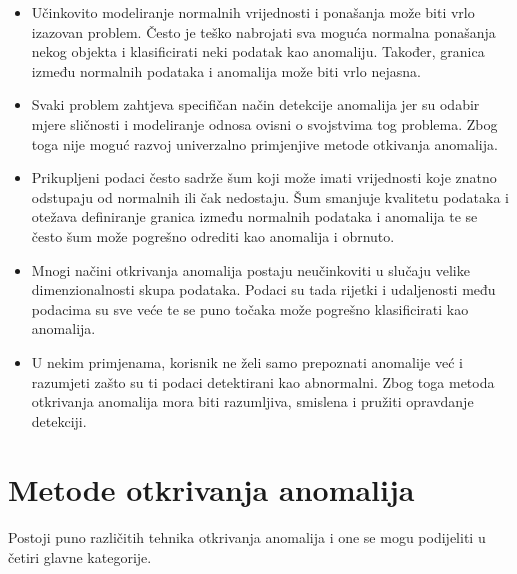 \documentclass[utf8, diplomski, numeric]{fer}
\begin{document}
\begin{itemize}
\item Učinkovito modeliranje normalnih vrijednosti i ponašanja može biti vrlo izazovan problem. Često je teško nabrojati sva moguća normalna ponašanja nekog objekta i klasificirati neki podatak kao anomaliju. Također, granica  između normalnih podataka i anomalija može biti vrlo nejasna.
\item Svaki problem zahtjeva specifičan način detekcije anomalija jer su odabir mjere sličnosti i modeliranje odnosa ovisni o svojstvima tog problema. Zbog toga nije moguć razvoj univerzalno primjenjive metode otkivanja anomalija.
\item Prikupljeni podaci često sadrže šum koji može imati vrijednosti koje znatno odstupaju od normalnih ili čak nedostaju. Šum smanjuje kvalitetu podataka i otežava definiranje granica između normalnih podataka i anomalija te se često šum može pogrešno odrediti kao anomalija i obrnuto.
\item Mnogi načini otkrivanja anomalija postaju neučinkoviti u slučaju velike dimenzionalnosti skupa podataka. Podaci su tada rijetki i udaljenosti među podacima su sve veće te se puno točaka može pogrešno klasificirati kao anomalija.
\item U nekim primjenama, korisnik ne želi samo prepoznati anomalije već i razumjeti zašto su ti podaci detektirani kao abnormalni. Zbog toga metoda otkrivanja anomalija mora biti razumljiva, smislena i pružiti opravdanje detekciji.
\end{itemize}

\section{Metode otkrivanja anomalija}
Postoji puno različitih tehnika otkrivanja anomalija i one se mogu podijeliti u četiri glavne kategorije.
\end{document}
